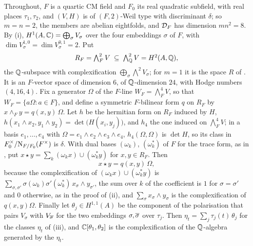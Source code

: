 Throughout, $F$ is a quartic CM field and $F_{0}$ its real quadratic subfield,
with real places $\tau_{1},\tau_{2}$, and $(V,H)$ is of $(F,2)$-Weil type with
discriminant $\delta$; so $m=n=2$, the members are abelian eightfolds, and
$\mathcal{D}_{F}$ has dimension $mn^{2}=8$. By (i),
$H^{1}(A,\mathbb{C})=\bigoplus_{\sigma}V_{\sigma}$ over the four embeddings $\sigma$ of
$F$, with $\dim V_{\sigma}^{1,0}=\dim V_{\sigma}^{0,1}=2$. Put
\[
  R_{F}=\textstyle\bigwedge^{2}_{F}V\;\subseteq\;\bigwedge^{2}_{\mathbb{Q}}V=H^{2}(A,\mathbb{Q}),
\]
the $\mathbb{Q}$-subspace with complexification
$\bigoplus_{\sigma}\bigwedge^{2}V_{\sigma}$; for $m=1$ it is the space $R$ of
. It is an $F$-vector space of dimension $6$, of
$\mathbb{Q}$-dimension $24$, with Hodge numbers $(4,16,4)$. Fix a generator $\Omega$
of the $F$-line $W_{F}=\bigwedge^{4}_{F}V$, so that
$W_{F}=\{a\Omega:a\in F\}$, and define a symmetric $F$-bilinear form $q$ on
$R_{F}$ by $x\wedge_{F}y=q(x,y)\,\Omega$. Let $h$ be the hermitian form on
$R_{F}$ induced by $H$, $h(x_{1}\wedge x_{2},y_{1}\wedge y_{2})
=\det\bigl(H(x_{i},y_{j})\bigr)$, and $h_{4}$ the one induced on
$\bigwedge^{4}_{F}V$; in a basis $e_{1},\dots,e_{4}$ with
$\Omega=e_{1}\wedge e_{2}\wedge e_{3}\wedge e_{4}$, $h_{4}(\Omega,\Omega)$ is
$\det H$, so its class in $F_{0}^{\times}/\mathrm{N}_{F/F_{0}}(F^{\times})$ is
$\delta$. With dual bases $(\omega_{k})$, $(\omega_{k}^{*})$ of $F$ for the
trace form, as in , put
$x\star y=\sum_{k}(\omega_{k}x)\cup(\omega_{k}^{*}y)$ for $x,y\in R_{F}$. Then
\begin{equation}\label{eq:quarticstar}
  x\star y=q(x,y)\,\Omega ,
\end{equation}
because the complexification of $(\omega_{k}x)\cup(\omega_{k}^{*}y)$ is
$\sum_{\sigma,\sigma'}\sigma(\omega_{k})\sigma'(\omega_{k}^{*})\,
x_{\sigma}\wedge y_{\sigma'}$, the sum over $k$ of the coefficient is $1$ for
$\sigma=\sigma'$ and $0$ otherwise, as in the proof of
(ii), and $\sum_{\sigma}x_{\sigma}\wedge y_{\sigma}$ is
the complexification of $q(x,y)\Omega$. Finally let $\theta_{j}\in H^{1,1}(A)$
be the component of the polarisation that pairs $V_{\sigma}$ with
$V_{\overline{\sigma}}$ for the two embeddings $\sigma,\overline{\sigma}$ over $\tau_{j}$.
Then $\eta_{t}=\sum_{j}\tau_{j}(t)\,\theta_{j}$ for the classes $\eta_{t}$ of
(iii), and $\mathbb{C}[\theta_{1},\theta_{2}]$ is the
complexification of the $\mathbb{Q}$-algebra generated by the $\eta_{t}$.

